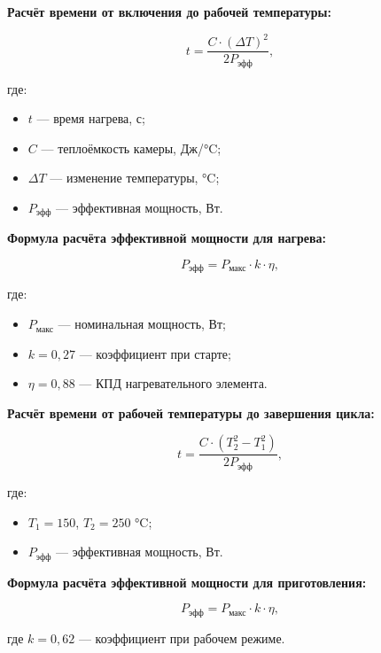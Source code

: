 \begin{enumerate}
\textbf{Расчёт времени от включения до рабочей температуры:}

\begin{equation}
t = \frac{C \cdot (\Delta T)^2}{2P_{\text{эфф}}},
\end{equation}

где:  
\begin{itemize}
    \item $t$ — время нагрева, с;  
    \item $C$ — теплоёмкость камеры, Дж/°C;  
    \item $\Delta T$ — изменение температуры, °C;  
    \item $P_{\text{эфф}}$ — эффективная мощность, Вт.  
\end{itemize}

\textbf{Формула расчёта эффективной мощности для нагрева:}

\begin{equation}
P_{\text{эфф}} = P_{\text{макс}} \cdot k \cdot \eta,
\end{equation}

где:  
\begin{itemize}
    \item $P_{\text{макс}}$ — номинальная мощность, Вт;  
    \item $k = 0{,}27$ — коэффициент при старте;  
    \item $\eta = 0{,}88$ — КПД нагревательного элемента.  
\end{itemize}

\textbf{Расчёт времени от рабочей температуры до завершения цикла:}

\begin{equation}
t = \frac{C \cdot (T_2^2 - T_1^2)}{2P_{\text{эфф}}},
\end{equation}

где:  
\begin{itemize}
    \item $T_1 = 150$, $T_2 = 250$ °C;  
    \item $P_{\text{эфф}}$ — эффективная мощность, Вт.  
\end{itemize}

\textbf{Формула расчёта эффективной мощности для приготовления:}

\begin{equation}
P_{\text{эфф}} = P_{\text{макс}} \cdot k \cdot \eta,
\end{equation}

где $k = 0{,}62$ — коэффициент при рабочем режиме.


\end{enumerate}
